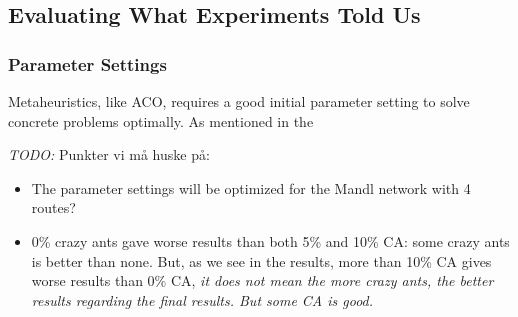 \subsection{Evaluating What Experiments Told Us}
\subsubsection{Parameter Settings}

Metaheuristics, like ACO, requires a good initial parameter setting to solve concrete problems optimally. As mentioned in the 

\emph{\color{blue} TODO:}
Punkter vi må huske på:
\begin{itemize}
\item The parameter settings will be optimized for the Mandl network with 4 routes?
\item 0\% crazy ants gave worse results than both 5\% and 10\% CA: some crazy ants is better than none. But, as we see in the results, more than 10\% CA gives worse results than 0\% CA, \emph{\color{blue} it does not mean the more crazy ants, the better results regarding the final results. But some CA is good.}
\end{itemize}